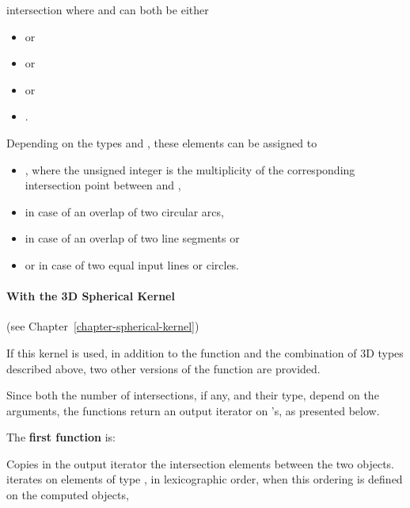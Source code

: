 \begin{ccRefFunction}{intersection}
where  and  can both be either
\begin{itemize}
\item {}  or
\item {}  or
\item {}  or
\item {} .
\end{itemize} 

Depending on the types  and , these
elements can be assigned to
\begin{itemize}
\item {} ,
where the unsigned integer is the multiplicity of the corresponding
intersection point between  and ,
\item {}  in case of an overlap of 
two circular arcs,
\item {}  in case of an overlap of two 
line segments or
\item {}  or 
 in case of two equal input lines or circles.
\end{itemize} 


\paragraph{With the 3D Spherical Kernel} (see Chapter~\ref{chapter-spherical-kernel}) 


If this kernel is used, in addition to the function and the
combination of 3D types described above, two other versions of the function
are provided.

Since both the number of intersections, if any, and their type,
depend on the arguments, the functions return an output
iterator on 's, as presented below. 

The \textbf{first function} is:

{Copies in the output iterator the intersection elements between the
two objects.  iterates on
elements of type , in lexicographic order,
when this ordering is defined on the computed objects,}


\end{ccRefFunction}
